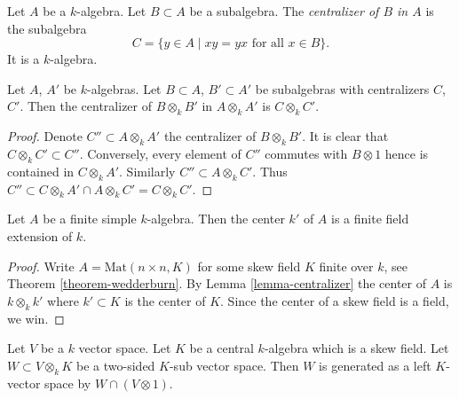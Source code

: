 \noindent
Let $A$ be a $k$-algebra. Let $B \subset A$ be a subalgebra.
The {\it centralizer of $B$ in $A$} is the subalgebra
$$
C  = \{y \in A \mid xy = yx \text{ for all }x \in B\}.
$$
It is a $k$-algebra.

\begin{lemma}
\label{lemma-centralizer}
Let $A$, $A'$ be $k$-algebras. Let $B \subset A$, $B' \subset A'$ be
subalgebras with centralizers $C$, $C'$. Then the centralizer of
$B \otimes_k B'$ in $A \otimes_k A'$ is $C \otimes_k C'$.
\end{lemma}

\begin{proof}
Denote $C'' \subset A \otimes_k A'$ the centralizer of $B \otimes_k B'$.
It is clear that $C \otimes_k C' \subset C''$. Conversely, every element
of $C''$ commutes with $B \otimes 1$ hence is contained in $C \otimes_k A'$.
Similarly $C'' \subset A \otimes_k C'$. Thus
$C'' \subset C \otimes_k A' \cap A \otimes_k C' = C \otimes_k C'$.
\end{proof}

\begin{lemma}
\label{lemma-center-csa}
Let $A$ be a finite simple $k$-algebra. Then the center $k'$ of $A$
is a finite field extension of $k$.
\end{lemma}

\begin{proof}
Write $A = \text{Mat}(n \times n, K)$ for some skew field $K$ finite
over $k$, see
Theorem \ref{theorem-wedderburn}.
By
Lemma \ref{lemma-centralizer}
the center of $A$ is $k \otimes_k k'$ where $k' \subset K$ is the
center of $K$. Since the center of a skew field is a field, we win.
\end{proof}

\begin{lemma}
\label{lemma-generate-two-sided-sub}
Let $V$ be a $k$ vector space. Let $K$ be a central $k$-algebra
which is a skew field. Let $W \subset V \otimes_k K$ be a two-sided
$K$-sub vector space. Then $W$ is generated as a left $K$-vector
space by $W \cap (V \otimes 1)$.
\end{lemma}

